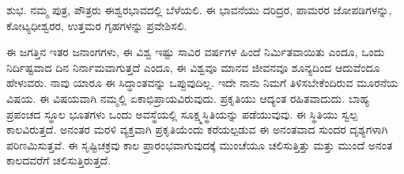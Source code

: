 ಶುಭ. ನಮ್ಮ ಪುತ್ರ, ಪೌತ್ರರು ಈಶ್ವರಭಾವದಲ್ಲಿ ಬೆಳೆಯಲಿ. ಈ ಭಾವನೆಯು ದರಿದ್ರರ, ಪಾಮರರ ಜೋಪಡಿಗಳನ್ನು, ಕೋಟ್ಯಧೀಶ್ವರರ, ಉತ್ತಮರ ಗೃಹಗಳನ್ನು ಪ್ರವೇಶಿಸಲಿ.

\vskip 2pt

ಈ ಜಗತ್ತಿನ ಇತರ ಜನಾಂಗಗಳು, ಈ ವಿಶ್ವ ಇಷ್ಟು ಸಾವಿರ ವರ್ಷಗಳ ಹಿಂದೆ ನಿರ್ಮಿತವಾಯಿತು ಎಂದೂ, ಒಂದು ನಿರ್ದಿಷ್ಟವಾದ ದಿನ ನಿರ್ನಾಮವಾಗುತ್ತದೆ ಎಂದೂ, ಈ ವಿಶ್ವವೂ ಮಾನವ ಜೀವನವೂ ಶೂನ್ಯದಿಂದ ಆದುವೆಂದೂ ಹೇಳುವರು. ನಾವು ಯಾರೂ ಈ ಸಿದ್ಧಾಂತವನ್ನು ಒಪ್ಪುವುದಿಲ್ಲ. ಇದೇ ನಾನು ನಿಮಗೆ ತಿಳಿಸಬೇಕೆಂದಿರುವ ಮೂರನೆಯ ವಿಷಯ. ಈ ವಿಷಯವಾಗಿ ನಮ್ಮಲ್ಲಿ ಏಕಾಭಿಪ್ರಾಯವಿರುವುದು. ಪ್ರಕೃತಿಯು ಆದ್ಯಂತ ರಹಿತವಾದುದು. ಬಾಹ್ಯ ಪ್ರಪಂಚದ ಸ್ಥೂಲ ಭೂತಗಳು ಒಂದು ಅವಸ್ಥೆಯಲ್ಲಿ ಸೂಕ್ಷ್ಮಸ್ಥಿತಿಯನ್ನು ಪಡೆಯುವುವು. ಈ ಸ್ಥಿತಿಯು ಸ್ವಲ್ಪ ಕಾಲವಿರುತ್ತದೆ. ಅನಂತರ ಮರಳಿ ವ್ಯಕ್ತವಾಗಿ ಪ್ರಕೃತಿಯೆಂದು ಕರೆಯಲ್ಪಡುವ ಈ ಅನಂತವಾದ ಸುಂದರ ದೃಶ್ಯಗಳಾಗಿ ಪರಿಣಮಿಸುತ್ತವೆ. ಈ ಸೃಷ್ಟಿಚಕ್ರವು ಕಾಲ ಪ್ರಾರಂಭವಾಗುವುದಕ್ಕೆ ಮುಂಚೆಯೂ ಚಲಿಸುತ್ತಿತ್ತು ಮತ್ತು ಮುಂದೆ ಅನಂತ ಕಾಲದವರೆಗೆ ಚಲಿಸುತ್ತಿರುತ್ತದೆ.

\vskip 2pt

